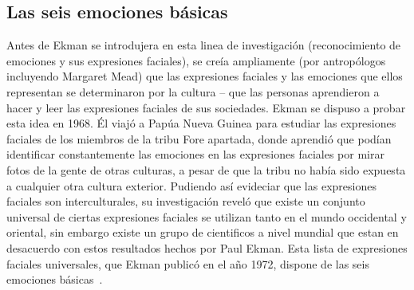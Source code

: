 \subsection{Las seis emociones básicas}
Antes de Ekman se introdujera en esta linea de investigación (reconocimiento de emociones y sus expresiones faciales), se creía ampliamente (por antropólogos incluyendo Margaret Mead) que las expresiones faciales y las emociones que ellos representan se determinaron por la cultura – que las personas aprendieron a hacer y leer las expresiones faciales de sus sociedades. Ekman se dispuso a probar esta idea en 1968. Él viajó a Papúa Nueva Guinea para estudiar las expresiones faciales de los miembros de la tribu Fore apartada, donde aprendió que podían identificar constantemente las emociones en las expresiones faciales por mirar fotos de la gente de otras culturas, a pesar de que la tribu no había sido expuesta a cualquier otra cultura exterior. Pudiendo así evideciar que las expresiones faciales son interculturales, su investigación reveló que existe un conjunto universal de ciertas expresiones faciales se utilizan tanto en el mundo occidental y oriental, sin embargo existe un grupo de cientificos a nivel mundial que estan en desacuerdo con estos resultados hechos por Paul Ekman. Esta lista de expresiones faciales universales, que Ekman publicó en el año 1972, dispone de las seis emociones básicas~\cite{29ekman2016scientists}.

